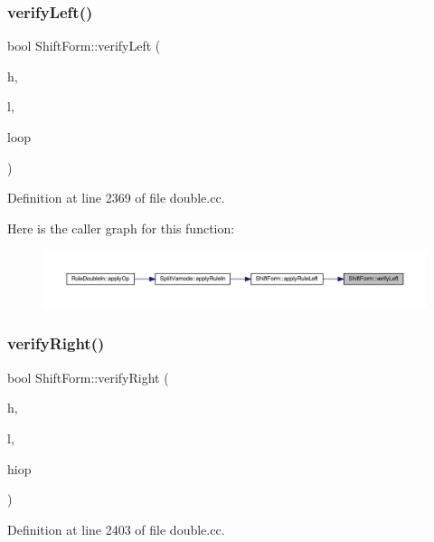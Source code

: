 \subsubsection{\texorpdfstring{verifyLeft()}{verifyLeft()}}
{\footnotesize\ttfamily bool Shift\+Form\+::verify\+Left (\begin{DoxyParamCaption}\item[{\mbox{\hyperlink{class_varnode}{Varnode}} $\ast$}]{h,  }\item[{\mbox{\hyperlink{class_varnode}{Varnode}} $\ast$}]{l,  }\item[{\mbox{\hyperlink{class_pcode_op}{Pcode\+Op}} $\ast$}]{loop }\end{DoxyParamCaption})}



Definition at line 2369 of file double.\+cc.

Here is the caller graph for this function\+:
\nopagebreak
\begin{figure}[H]
\begin{center}
\leavevmode
\includegraphics[width=350pt]{class_shift_form_ae52dfd26b10069bcfab400b66d5b71eb_icgraph}
\end{center}
\end{figure}
\mbox{\label{class_shift_form_ae3063410d8b9584c9f0be3a345e0ee9c}} 
\subsubsection{\texorpdfstring{verifyRight()}{verifyRight()}}
{\footnotesize\ttfamily bool Shift\+Form\+::verify\+Right (\begin{DoxyParamCaption}\item[{\mbox{\hyperlink{class_varnode}{Varnode}} $\ast$}]{h,  }\item[{\mbox{\hyperlink{class_varnode}{Varnode}} $\ast$}]{l,  }\item[{\mbox{\hyperlink{class_pcode_op}{Pcode\+Op}} $\ast$}]{hiop }\end{DoxyParamCaption})}



Definition at line 2403 of file double.\+cc.

